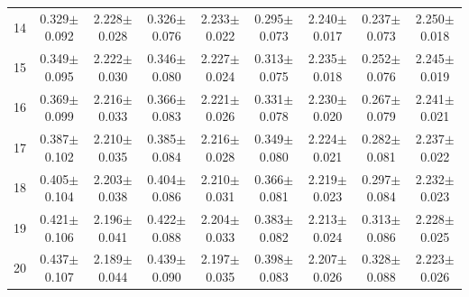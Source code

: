 \begin{table}[H]
{\begin{tabular}{c cc cc cc cc}
14 & 0.329$\pm$0.092 & 2.228$\pm$0.028 & 0.326$\pm$0.076 & 2.233$\pm$0.022 & 0.295$\pm$0.073 & 2.240$\pm$0.017 & 0.237$\pm$0.073 & 2.250$\pm$0.018 \\
15 & 0.349$\pm$0.095 & 2.222$\pm$0.030 & 0.346$\pm$0.080 & 2.227$\pm$0.024 & 0.313$\pm$0.075 & 2.235$\pm$0.018 & 0.252$\pm$0.076 & 2.245$\pm$0.019 \\
16 & 0.369$\pm$0.099 & 2.216$\pm$0.033 & 0.366$\pm$0.083 & 2.221$\pm$0.026 & 0.331$\pm$0.078 & 2.230$\pm$0.020 & 0.267$\pm$0.079 & 2.241$\pm$0.021 \\
17 & 0.387$\pm$0.102 & 2.210$\pm$0.035 & 0.385$\pm$0.084 & 2.216$\pm$0.028 & 0.349$\pm$0.080 & 2.224$\pm$0.021 & 0.282$\pm$0.081 & 2.237$\pm$0.022 \\
18 & 0.405$\pm$0.104 & 2.203$\pm$0.038 & 0.404$\pm$0.086 & 2.210$\pm$0.031 & 0.366$\pm$0.081 & 2.219$\pm$0.023 & 0.297$\pm$0.084 & 2.232$\pm$0.023 \\
19 & 0.421$\pm$0.106 & 2.196$\pm$0.041 & 0.422$\pm$0.088 & 2.204$\pm$0.033 & 0.383$\pm$0.082 & 2.213$\pm$0.024 & 0.313$\pm$0.086 & 2.228$\pm$0.025 \\
20 & 0.437$\pm$0.107 & 2.189$\pm$0.044 & 0.439$\pm$0.090 & 2.197$\pm$0.035 & 0.398$\pm$0.083 & 2.207$\pm$0.026 & 0.328$\pm$0.088 & 2.223$\pm$0.026 \\

\bottomrule

\end{tabular}
}
\end{table}
